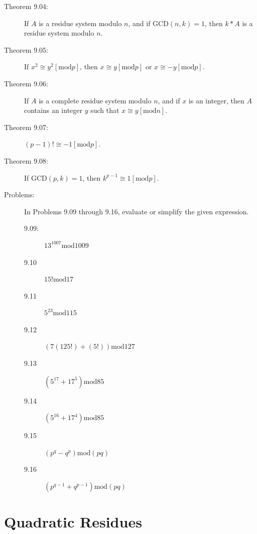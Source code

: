 \documentclass{article}
\begin{document}
\begin{description}
  \item[Theorem 9.04:] If $A$ is a residue system modulo $n$, and if $\text{GCD}(n,k) = 1$, then $k*A$ is a residue system modulo $n$.

  \item[Theorem 9.05:] If $x^2 \cong y^2 [\text{mod} p]$, then $x \cong y [\text{mod} p]$ or $x \cong -y [\text{mod} p]$.

  \item[Theorem 9.06:] If $A$ is a complete residue system modulo $n$, and if $x$ is an integer, then $A$ contains an integer $y$ such that $x \cong y [\text{mod} n]$.

  \item[Theorem 9.07:] $(p-1)! \cong -1 [\text{mod} p]$.

  \item[Theorem 9.08:] If $\text{GCD}(p,k) = 1$, then $k^{p-1} \cong 1 [\text{mod} p]$.

  \item[Problems:] In Problems 9.09 through 9.16, evaluate or simplify the given expression.
    \begin{description}
      \item[9.09:] $13^{1007} \text{mod} 1009$
      \item[9.10] $15! \text{mod} 17$
      \item[9.11] $5^{23} \text{mod} 115$
      \item[9.12] $(7(125!)+(5!)) \text{mod} 127$
      \item[9.13] $(5^{17}+17^5) \text{mod} 85$
      \item[9.14] $(5^{16}+17^4) \text{mod} 85$
      \item[9.15] $(p^q-q^p) \text{mod} (pq)$
      \item[9.16] $(p^{q-1}+q^{p-1}) \text{mod} (pq)$
    \end{description}

\end{description}


\section{Quadratic Residues}
\end{document}
